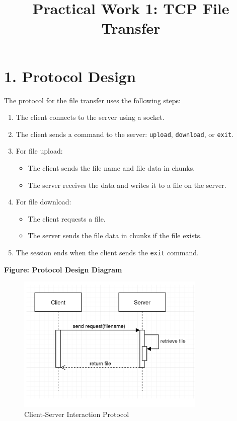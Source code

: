 \documentclass[a4paper,12pt]{article}
\title{Practical Work 1: TCP File Transfer}
\author{}
\date{}
\begin{document}
\maketitle

\section*{1. Protocol Design}
The protocol for the file transfer uses the following steps:
\begin{enumerate}
    \item The client connects to the server using a socket.
    \item The client sends a command to the server: \texttt{upload}, \texttt{download}, or \texttt{exit}.
    \item For file upload:
    \begin{itemize}
        \item The client sends the file name and file data in chunks.
        \item The server receives the data and writes it to a file on the server.
    \end{itemize}
    \item For file download:
    \begin{itemize}
        \item The client requests a file.
        \item The server sends the file data in chunks if the file exists.
    \end{itemize}
    \item The session ends when the client sends the \texttt{exit} command.
\end{enumerate}

\noindent \textbf{Figure: Protocol Design Diagram}
\begin{figure}[h!]
    \centering
    \includegraphics[width=0.8\textwidth]{protocal_figure.png} %
    \caption{Client-Server Interaction Protocol}
\end{figure}
\end{document}
